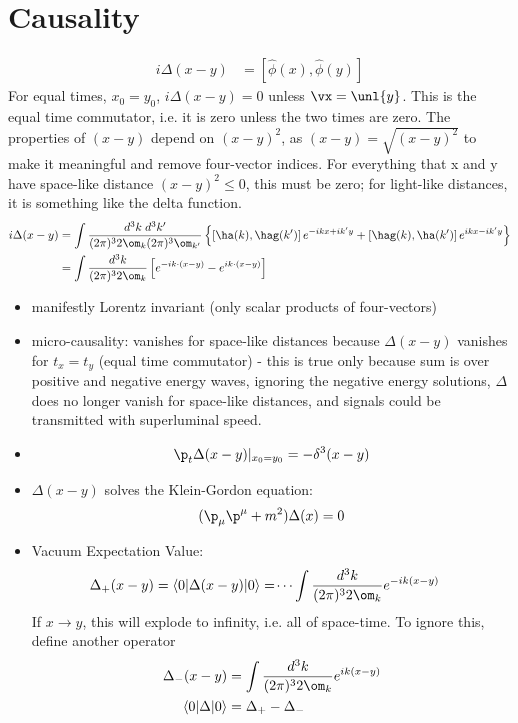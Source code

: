 \documentclass[a4paper, 11pt, normalem]{report}
\newcommand\hphi{\hat{\phi}}
\begin{document}
\section{Causality}
\begin{align}
    i\Delta(x-y) &= [\hphi(x),\hphi(y)]
\end{align}
For equal times, $x_0=y_0$, $i\Delta(x-y) = 0$ unless $\vx = \unl{y}$.
This is the equal time commutator, i.e. it is zero unless the two times are zero.
The properties of $(x-y)$ depend on $(x-y)^2$, as $(x-y) = \sqrt{(x-y)^2}$ to make it meaningful and remove four-vector indices.
For everything that x and y have space-like distance $(x-y)^2\leq0$, this must be zero; for light-like distances, it is something like the delta function.
\begin{align}
    i\Delta(x-y) &= \int \frac{d^3k\;d^3k'}{(2\pi)^32\om_k (2\pi)^3\om_{k'}} \left\{ \left[\ha(k),\hag(k')\right]e^{-ikx + ik'y} + \left[\hag(k),\ha(k')\right]e^{ikx-ik'y}\right\} \\
                 &= \int \frac{d^3k}{(2\pi)^3 2\om_k} \left[e^{-ik\cdot(x-y)} - e^{ik\cdot(x-y)}\right]
\end{align}
\begin{itemize}
    \item manifestly Lorentz invariant (only scalar products of four-vectors)
    \item micro-causality: vanishes for space-like distances because $\Delta(x-y)$ vanishes for $t_x = t_y$ (equal time commutator) - this is true only because sum is over positive and negative energy waves, ignoring the negative energy solutions, $\Delta$ does no longer vanish for space-like distances, and signals could be transmitted with superluminal speed.
    \item
        \begin{align}
            \p_t\Delta(x-y)|_{x_0=y_0} = -\delta^3(x-y)
        \end{align}
    \item $\Delta(x-y)$ solves the Klein-Gordon equation:
        \begin{equation}
            (\p_\mu\p^\mu + m^2)\Delta(x) = 0
        \end{equation}
    \item Vacuum Expectation Value:
        \begin{align}
            \Delta_+(x-y) &= \langle0|\Delta(x-y)|0\rangle = \dots \int\frac{d^3k}{(2\pi)^32\om_k} e^{-ik(x-y)}
        \end{align}
        If $x\to y$, this will explode to infinity, i.e. all of space-time.
        To ignore this, define another operator
        \begin{align}
            \Delta_-(x-y) &= \int \frac{d^3k}{(2\pi)^32\om_k}e^{ik(x-y)} \\
            \langle0|\Delta|0\rangle &= \Delta_+ - \Delta_-
        \end{align}
\end{itemize}
\end{document}
